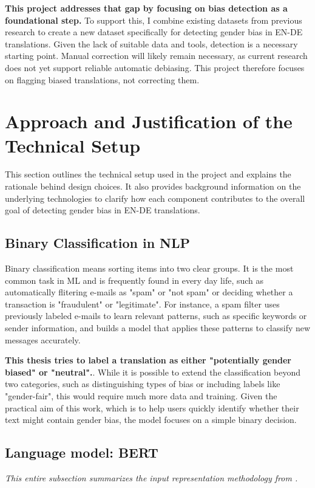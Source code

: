    \textbf{This project addresses that gap by focusing on bias detection as a foundational step.} To support this, I combine existing datasets from previous research to create a new dataset specifically for detecting gender bias in EN-DE translations. Given the lack of suitable data and tools, detection is a necessary starting point. Manual correction will likely remain necessary, as current research does not yet support reliable automatic debiasing. This project therefore focuses on flagging biased translations, not correcting them.


\section{Approach and Justification of the Technical Setup}
    This section outlines the technical setup used in the project and explains the rationale behind design choices. It also provides background information on the underlying technologies to clarify how each component contributes to the overall goal of detecting gender bias in EN-DE translations.

\subsection{Binary Classification in NLP}
    Binary classification means sorting items into two clear groups. It is the most common task in ML and is frequently found in every day life, such as automatically flitering e-mails as "spam" or "not spam" \citep{quemyBinaryClassificationUnstructured2019} or deciding whether a transaction is "fraudulent" or "legitimate". For instance, a spam filter uses previously labeled e-mails to learn relevant patterns, such as specific keywords or sender information, and builds a model that applies these patterns to classify new messages accurately. 
    
    \textbf{This thesis tries to label a translation as either "potentially gender biased" or "neutral".}. While it is possible to extend the classification beyond two categories, such as distinguishing types of bias or including labels like "gender-fair", this would require much more data and training. Given the practical aim of this work, which is to help users quickly identify whether their text might contain gender bias, the model focuses on a simple binary decision.

\subsection{Language model: BERT}
    \emph{This entire subsection summarizes the input representation methodology from \citet{devlinBERTPretrainingDeep2019}.}

